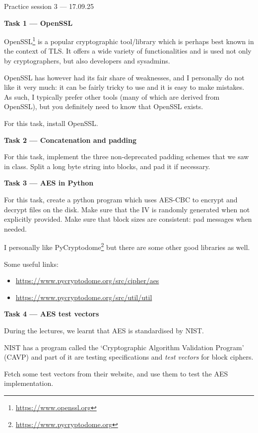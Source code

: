 \documentclass{practice}
\begin{document}
\begin{center}
Practice session 3 --- 17.09.25
\end{center}

\textbf{Task 1 --- OpenSSL}

OpenSSL\footnote{\url{https://www.openssl.org}} is a popular cryptographic tool/library which is perhaps best known in the context of TLS.
It offers a wide variety of functionalities and is used not only by cryptographers, but also developers and sysadmins.

OpenSSL has however had its fair share of weaknesses, and I personally do not like it very much: it can be fairly tricky to use and it is easy to make mistakes.
As such, I typically prefer other tools (many of which are derived from OpenSSL), but you definitely need to know that OpenSSL exists.

For this task, install OpenSSL.

\textbf{Task 2 --- Concatenation and padding}

For this task, implement the three non-deprecated padding schemes that we saw in class.
Split a long byte string into blocks, and pad it if necessary.

\textbf{Task 3 --- AES in Python}

For this task, create a python program which uses AES-CBC to encrypt and decrypt files on the disk. Make sure that the IV is randomly generated when not explicitly provided.
Make sure that block sizes are consistent: pad messages when needed.

I personally like PyCryptodome\footnote{\url{https://www.pycryptodome.org}} but there are some other good libraries as well.

Some useful links:
\begin{itemize}
  \item \url{https://www.pycryptodome.org/src/cipher/aes}
  \item \url{https://www.pycryptodome.org/src/util/util}
\end{itemize}

\textbf{Task 4 --- AES test vectors}

During the lectures, we learnt that AES is standardised by NIST.

NIST has a program called the `Cryptographic Algorithm Validation Program' (CAVP) and part of it are testing specifications and \emph{test vectors} for block ciphers.

Fetch some test vectors from their website, and use them to test the AES implementation.
\end{document}
